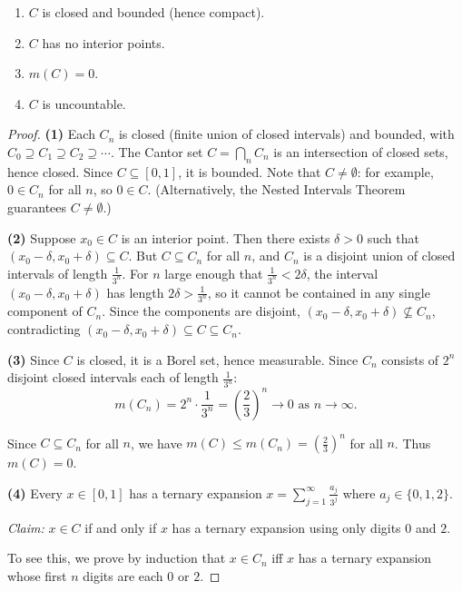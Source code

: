 \documentclass[11pt]{report}
\begin{document}
\begin{propbox}
\begin{enumerate}
    \item $C$ is closed and bounded (hence compact).
    \item $C$ has no interior points.
    \item $m(C) = 0$.
    \item $C$ is uncountable.
\end{enumerate}
\end{propbox}

\begin{proof}
\textbf{(1)} Each $C_n$ is closed (finite union of closed intervals) and bounded, with $C_0 \supseteq C_1 \supseteq C_2 \supseteq \cdots$. The Cantor set $C = \bigcap_n C_n$ is an intersection of closed sets, hence closed. Since $C \subseteq [0, 1]$, it is bounded. Note that $C \neq \emptyset$: for example, $0 \in C_n$ for all $n$, so $0 \in C$. (Alternatively, the Nested Intervals Theorem guarantees $C \neq \emptyset$.)

\textbf{(2)} Suppose $x_0 \in C$ is an interior point. Then there exists $\delta > 0$ such that $(x_0 - \delta, x_0 + \delta) \subseteq C$. But $C \subseteq C_n$ for all $n$, and $C_n$ is a disjoint union of closed intervals of length $\frac{1}{3^n}$. For $n$ large enough that $\frac{1}{3^n} < 2\delta$, the interval $(x_0 - \delta, x_0 + \delta)$ has length $2\delta > \frac{1}{3^n}$, so it cannot be contained in any single component of $C_n$. Since the components are disjoint, $(x_0 - \delta, x_0 + \delta) \not\subseteq C_n$, contradicting $(x_0 - \delta, x_0 + \delta) \subseteq C \subseteq C_n$.

\textbf{(3)} Since $C$ is closed, it is a Borel set, hence measurable. Since $C_n$ consists of $2^n$ disjoint closed intervals each of length $\frac{1}{3^n}$:
\[
m(C_n) = 2^n \cdot \frac{1}{3^n} = \left(\frac{2}{3}\right)^n \to 0 \text{ as } n \to \infty.
\]

Since $C \subseteq C_n$ for all $n$, we have $m(C) \leq m(C_n) = \left(\frac{2}{3}\right)^n$ for all $n$. Thus $m(C) = 0$.

\textbf{(4)} Every $x \in [0, 1]$ has a ternary expansion $x = \sum_{j=1}^{\infty} \frac{a_j}{3^j}$ where $a_j \in \{0, 1, 2\}$.

\textit{Claim:} $x \in C$ if and only if $x$ has a ternary expansion using only digits $0$ and $2$.

To see this, we prove by induction that $x \in C_n$ iff $x$ has a ternary expansion whose first $n$ digits are each $0$ or $2$.


\end{proof}
\end{document}
